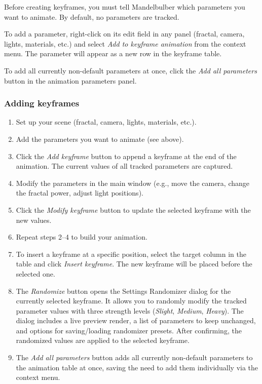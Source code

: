 Before creating keyframes, you must tell Mandelbulber which parameters you want to animate. By default, no parameters are tracked.

To add a parameter, right-click on its edit field in any panel (fractal, camera, lights, materials, etc.) and select \emph{Add to keyframe animation} from the context menu. The parameter will appear as a new row in the keyframe table.

To add all currently non-default parameters at once, click the \emph{Add all parameters} button in the animation parameters panel.

\subsubsection{Adding keyframes}

\begin{enumerate}
	\item Set up your scene (fractal, camera, lights, materials, etc.).
	
	\item Add the parameters you want to animate (see above).
	
	\item Click the \emph{Add keyframe} button to append a keyframe at the end of the animation. The current values of all tracked parameters are captured.
	
	\item Modify the parameters in the main window (e.g., move the camera, change the fractal power, adjust light positions).
	
	\item Click the \emph{Modify keyframe} button to update the selected keyframe with the new values.
	
	\item Repeat steps 2--4 to build your animation.
	
	\item To insert a keyframe at a specific position, select the target column in the table and click \emph{Insert keyframe}. The new keyframe will be placed before the selected one.
	
	\item The \emph{Randomize} button opens the Settings Randomizer dialog for the currently selected keyframe. It allows you to randomly modify the tracked parameter values with three strength levels (\emph{Slight}, \emph{Medium}, \emph{Heavy}). The dialog includes a live preview render, a list of parameters to keep unchanged, and options for saving/loading randomizer presets. After confirming, the randomized values are applied to the selected keyframe.
	
	\item The \emph{Add all parameters} button adds all currently non-default parameters to the animation table at once, saving the need to add them individually via the context menu.
\end{enumerate}

